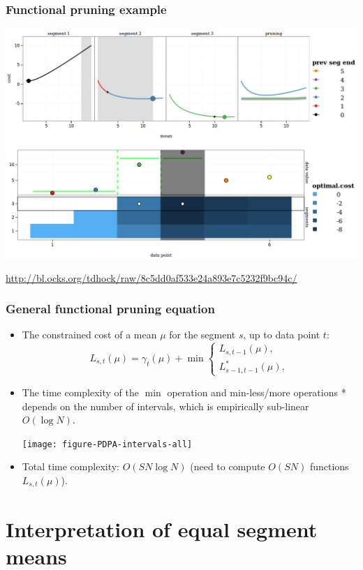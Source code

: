 \documentclass{beamer}
\begin{document}
\begin{frame}
  \frametitle{Functional pruning example}
\includegraphics[width=\textwidth]{screenshot-PDPA-demo}

  \url{http://bl.ocks.org/tdhock/raw/8c5dd0af533e24a893e7c5232f9bc94c/}
\end{frame}

\begin{frame}
  \frametitle{General functional pruning equation}
  \begin{itemize}
  \item The constrained cost of a mean $\mu$ for the segment $s$,
    up to data point $t$:
    \begin{equation*}
      L_{s,t}(\mu) = \gamma_t(\mu) + \min
      \begin{cases}
        L_{s,t-1}(\mu),\\
        L_{s-1,t-1}^{*}(\mu),
      \end{cases}
    \end{equation*}
  \item The time complexity of the $\min$ operation and min-less/more
    operations * depends on the number of intervals, which is
    empirically sub-linear $O(\log N)$.
    \begin{center}
      \texttt{[image: figure-PDPA-intervals-all]}
    \end{center}
  \item Total time complexity: $O(S N\log N)$ (need to compute $O(SN)$
    functions $L_{s,t}(\mu)$).
  \end{itemize}
\end{frame}

\section{Interpretation of equal segment means}
\end{document}
